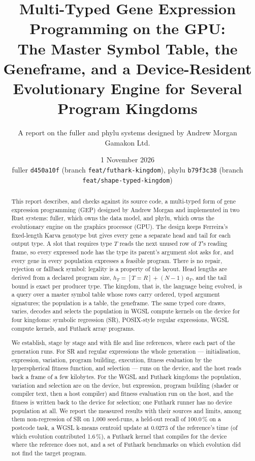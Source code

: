 \documentclass[11pt,a4paper]{report}
\title{Multi-Typed Gene Expression Programming on the GPU:\\[4pt]
\large The Master Symbol Table, the Geneframe, and a Device-Resident\\ Evolutionary Engine for Several Program Kingdoms}
\author{A report on the fuller and phylu systems designed by Andrew Morgan\\[2pt]
\small Gamakon Ltd.}
\date{1 November 2026\\[2pt]\small fuller \texttt{d450a10f} (branch \texttt{feat/futhark-kingdom}),
phylu \texttt{b79f3c38} (branch \texttt{feat/shape-typed-kingdom})}
\begin{document}
\maketitle

\begin{abstract}
This report describes, and checks against its source code, a multi-typed form of
gene expression programming (GEP) designed by Andrew Morgan and implemented in two
Rust systems: fuller, which owns the data model, and phylu, which owns the
evolutionary engine on the graphics processor (GPU). The design keeps
Ferreira's fixed-length Karva genotype but gives every gene a separate head and
tail for each output type. A slot that requires type $T$ reads the next unused
row of $T$'s reading frame, so every expressed node has the type its parent's
argument slot asks for, and every gene in every population expresses a feasible
program. There is no repair, rejection or fallback symbol: legality is a
property of the layout. Head lengths are derived from a declared program size,
$h_T=[T=R]+(N-1)\,a_T$, and the tail bound is exact per producer type. The
kingdom, that is, the language being evolved, is a query over a master symbol
table whose rows carry ordered, typed argument signatures; the population is a
table, the geneframe. The same typed core draws, varies, decodes and selects
the population in WGSL compute kernels on the device for four kingdoms:
symbolic regression (SR), POSIX-style regular expressions, WGSL compute kernels,
and Futhark array programs.

We establish, stage by stage and with file and line references, where each part
of the generation runs. For SR and regular expressions the whole generation
--- initialisation, expression, variation, program building, execution, fitness
evaluation by the hyperspherical fitness function, and selection --- runs on
the device, and the host reads back a frame of a few kilobytes. For the WGSL and
Futhark kingdoms the population, variation and selection are on the device, but
expression, program building (shader or compiler text, then a host compiler)
and fitness evaluation run on the host, and the fitness is written back to the
device for selection; one Futhark runner has no device population at all. We
report the measured results with their sources and limits, among them
non-regression of SR on 1,000 seed-runs, a held-out recall of 100.0\,\% on a
postcode task, a WGSL k-means centroid update at 0.0273 of the reference's
time (of which evolution contributed 1.6\,\%), a Futhark kernel that compiles
for the device where the reference does not, and a set of Futhark benchmarks on
which evolution did not find the target program.
\end{abstract}
\end{document}
